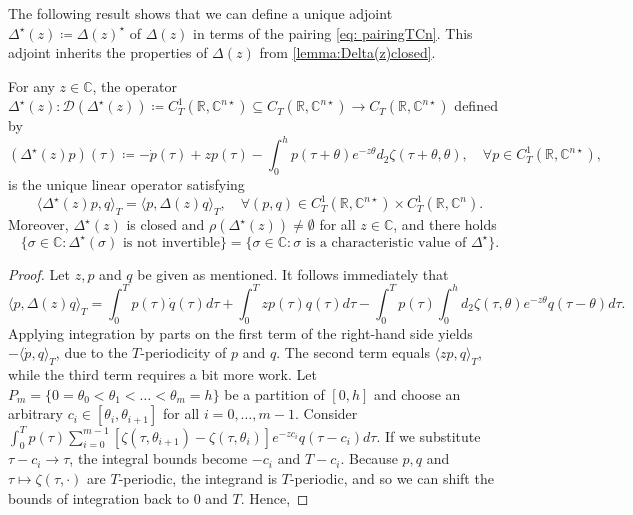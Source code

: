 \documentclass[english]{myarticle}
\begin{document}
\begin{sloppypar}
The following result shows that we can define a unique adjoint $\Delta^\star(z) \coloneqq \Delta(z)^\star$ of $\Delta(z)$ in terms of the pairing \eqref{eq: pairingTCn}. This adjoint inherits the properties of $\Delta(z)$ from \cref{lemma:Delta(z)closed}.

\begin{lemma} \label{lemma:adjoint charac}
For any $z \in \mathbb{{C}}$, the operator $\Delta^\star(z) : \mathcal{D}(\Delta^\star(z)) \coloneqq C_T^1(\mathbb{R},\mathbb{C}^{n \star}) \subseteq C_T(\mathbb{R},\mathbb{C}^{n \star}) \to C_T(\mathbb{{R}},\mathbb{C}^{n \star})$ defined by
\begin{equation} \label{eq:adjoint charac operator}
    (\Delta^\star(z)p)(\tau) \coloneqq -\dot{p}(\tau) + zp(\tau) - \int_0^h   p(\tau + \theta) e^{-z \theta} d_2 \zeta(\tau + \theta,\theta), \quad \forall p \in C_T^1(\mathbb{R},\mathbb{C}^{n \star}), 
\end{equation}
is the unique linear operator satisfying
\begin{equation} \label{eq:pairing charac}
    \langle \Delta^\star(z)p,q \rangle_T = \langle p,\Delta(z)q \rangle_T, \quad \forall (p,q) \in C_T^1(\mathbb{R},\mathbb{C}^{n \star}) \times C_T^1(\mathbb{R},\mathbb{C}^n).
\end{equation}
Moreover, $\Delta^\star(z)$ is closed and $\rho(\Delta^\star(z)) \neq \emptyset$ for all $z \in \mathbb{C}$, and there holds
\begin{equation*} 
    \{ \sigma \in \mathbb{C} : \Delta^\star(\sigma) \mbox{ is not invertible} \} = \{ \sigma \in \mathbb{C} : \sigma \mbox{ is a characteristic value of } \Delta^\star \}. 
\end{equation*}
\end{lemma}
\begin{proof}
Let $z,p$ and $q$ be given as mentioned. It follows immediately that
\begin{equation*}
    \langle p, \Delta(z)q \rangle_T = \int_0^T  p(\tau) \dot{q}(\tau) d\tau +  \int_0^T  zp(\tau)q(\tau) d\tau - \int_0^T p(\tau) \int_0^h d_2 \zeta(\tau,\theta) e^{-z\theta}q(\tau-\theta) d\tau.
\end{equation*}
Applying integration by parts on the first term of the right-hand side yields $-\langle \dot{p},q \rangle_T$, due to the $T$-periodicity of $p$ and $q$. The second term equals $\langle zp,q \rangle_T$, while the third term requires a bit more work. Let $P_m = \{0 = \theta_0 < \theta_1 < \dots < \theta_m = h \}$ be a partition of $[0,h]$ and choose an arbitrary $c_i \in [\theta_{i},\theta_{i+1}]$ for all $i = 0,\dots,m-1$. Consider  $\int_0^T  p(\tau) \sum_{i=0}^{m-1} [ \zeta(\tau,\theta_{i+1}) - \zeta(\tau,\theta_i)] e^{-z c_i}q(\tau - c_i)  d\tau$. If we substitute $ \tau - c_i \to \tau$, the integral bounds become $-c_i$ and $T - c_i$. Because $p,q$ and $\tau \mapsto \zeta(\tau,\cdot)$ are $T$-periodic, the integrand is $T$-periodic, and so we can shift the bounds of integration back to $0$ and $T$. Hence,

\end{proof}
\end{sloppypar}
\end{document}

